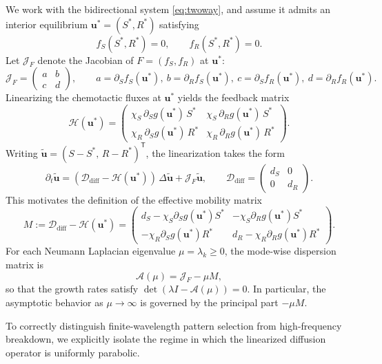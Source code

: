 \documentclass[pdflatex,sn-mathphys-ay]{sn-jnl}
\theoremstyle{thmstyleone}
\theoremstyle{definition}
\theoremstyle{remark}
\begin{document}
We work with the bidirectional system \eqref{eq:twoway},
and assume it admits an interior equilibrium $\mathbf{u}^*=(S^*,R^*)$ satisfying
\[
f_S(S^*,R^*)=0,\qquad f_R(S^*,R^*)=0.
\]
Let $\mathcal{J}_F$ denote the Jacobian of $F=(f_S,f_R)$ at $\mathbf{u}^*$:
\[
\mathcal{J}_F=
\begin{pmatrix}
a & b\\
c & d
\end{pmatrix},
\qquad
a=\partial_S f_S(\mathbf{u}^*),\ 
b=\partial_R f_S(\mathbf{u}^*),\ 
c=\partial_S f_R(\mathbf{u}^*),\ 
d=\partial_R f_R(\mathbf{u}^*).
\]
Linearizing the chemotactic fluxes at $\mathbf{u}^*$ yields the feedback matrix
\[
\mathcal{H}(\mathbf{u}^*)=
\begin{pmatrix}
\chi_S\,\partial_S g(\mathbf{u}^*)\,S^* & \chi_S\,\partial_R g(\mathbf{u}^*)\,S^*\\[2pt]
\chi_R\,\partial_S g(\mathbf{u}^*)\,R^* & \chi_R\,\partial_R g(\mathbf{u}^*)\,R^*
\end{pmatrix}.
\]
Writing $\tilde{\mathbf{u}}=(S-S^*,\,R-R^*)^{\mathsf T}$, the linearization takes the form
\[
\partial_t \tilde{\mathbf{u}}
= (\mathcal{D}_{\mathrm{diff}}-\mathcal{H}(\mathbf{u}^*))\,\Delta \tilde{\mathbf{u}} + \mathcal{J}_F\tilde{\mathbf{u}},
\qquad 
\mathcal{D}_{\mathrm{diff}}=\begin{pmatrix} d_S & 0\\ 0 & d_R\end{pmatrix}.
\]
This motivates the definition of the effective mobility matrix
\begin{equation}
\label{eq:effective_mobility}
M:=\mathcal{D}_{\mathrm{diff}}-\mathcal{H}(\mathbf{u}^*)
=
\begin{pmatrix}
d_S-\chi_S\partial_S g(\mathbf{u}^*)S^* & -\chi_S\partial_R g(\mathbf{u}^*)S^*\\[2pt]
-\chi_R\partial_S g(\mathbf{u}^*)R^* & d_R-\chi_R\partial_R g(\mathbf{u}^*)R^*
\end{pmatrix}.
\end{equation}
For each Neumann Laplacian eigenvalue $\mu=\lambda_k\ge 0$, the mode-wise dispersion matrix is
\begin{equation}\label{eq:dispersion_matrix}
\mathcal{A}(\mu)=\mathcal{J}_F-\mu M,
\end{equation}
so that the growth rates satisfy $\det(\lambda I-\mathcal{A}(\mu))=0$. 
In particular, the asymptotic behavior as $\mu\to\infty$ is governed by the principal part $-\mu M$.

To correctly distinguish finite-wavelength pattern selection from high-frequency breakdown, we explicitly isolate the regime in which the linearized diffusion operator is uniformly parabolic.
\end{document}
